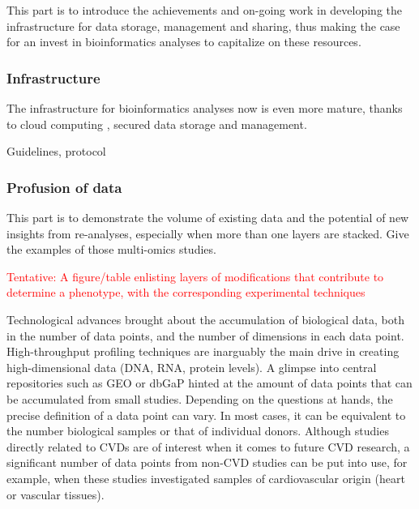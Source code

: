 \documentclass[letter]{bioinfo}
\newcommand{\comment}[1]{\textcolor{red}{#1}}
\begin{document}
This part is to introduce the achievements and on-going work in developing the infrastructure for data storage, management and sharing, thus making the case for an invest in bioinformatics analyses to capitalize on these resources.


\subsubsection{Infrastructure}

The infrastructure for bioinformatics analyses now is even more mature, thanks to cloud computing \citep{Langmead:2018:Cloud}, secured data storage and management.

Guidelines, protocol



\subsubsection{Profusion of data}


This part is to demonstrate the volume of existing data and the potential of new insights from re-analyses, especially when more than one layers are stacked. Give the examples of those multi-omics studies.


\comment{Tentative: A figure/table enlisting layers of modifications that contribute to determine a phenotype, with the corresponding experimental techniques}

\cite{Santolini:2018:personalized} 

\cite{Klarin:2017:Genetic}

Technological advances brought about the accumulation of biological data, both in the number of data points, and the number of dimensions in each data point.
High-throughput profiling techniques are inarguably the main drive in creating high-dimensional data (DNA, RNA, protein levels).
A glimpse into central repositories such as GEO or dbGaP hinted at the amount of data points that can be accumulated from small  studies. Depending on the questions at hands, the precise definition of a data point can vary. In most cases, it can be equivalent to the number biological samples or that of individual donors. Although studies directly related to CVDs are of interest when it comes to future CVD research, a significant number of data points from non-CVD studies can be put into use, for example, when these studies investigated samples of cardiovascular origin (heart or vascular tissues).
\end{document}
